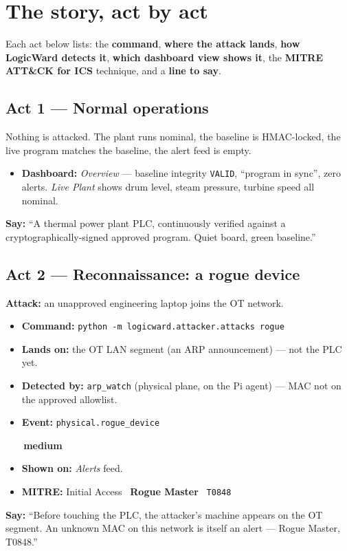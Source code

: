 \documentclass[11pt,a4paper]{article}
\newcommand{\code}[1]{\texttt{\small #1}}
\newcommand{\sev}[2]{\colorbox{#1}{\small\strut\,#2\,}}
\newcommand{\med}{\sev{medbg}{\color{warn}\textbf{medium}}}
\begin{document}
\section{The story, act by act}

Each act below lists: the \textbf{command}, \textbf{where the attack lands}, \textbf{how
LogicWard detects it}, \textbf{which dashboard view shows it}, the \textbf{MITRE ATT\&CK
for ICS} technique, and a \textbf{line to say}.

\subsection{Act 1 --- Normal operations}
Nothing is attacked. The plant runs nominal, the baseline is HMAC-locked, the live program
matches the baseline, the alert feed is empty.
\begin{itemize}[leftmargin=1.3em,itemsep=1pt]
  \item \textbf{Dashboard:} \emph{Overview} --- baseline integrity \code{VALID}, ``program
        in sync'', zero alerts. \emph{Live Plant} shows drum level, steam pressure, turbine
        speed all nominal.
\end{itemize}
\begin{say}\textbf{Say:} ``A thermal power plant PLC, continuously verified against a
cryptographically-signed approved program. Quiet board, green baseline.''\end{say}

\subsection{Act 2 --- Reconnaissance: a rogue device}
\textbf{Attack:} an unapproved engineering laptop joins the OT network.
\begin{itemize}[leftmargin=1.3em,itemsep=1pt]
  \item \textbf{Command:} \code{python -m logicward.attacker.attacks rogue}
  \item \textbf{Lands on:} the OT LAN segment (an ARP announcement) --- not the PLC yet.
  \item \textbf{Detected by:} \code{arp\_watch} (physical plane, on the Pi agent) --- MAC not
        on the approved allowlist.
  \item \textbf{Event:} \code{physical.rogue\_device} \quad\med
  \item \textbf{Shown on:} \emph{Alerts} feed.
  \item \textbf{MITRE:} Initial Access \textbullet\ \textbf{Rogue Master} \textbullet\ \code{T0848}
\end{itemize}
\begin{say}\textbf{Say:} ``Before touching the PLC, the attacker's machine appears on the
OT segment. An unknown MAC on this network is itself an alert --- Rogue Master, T0848.''\end{say}
\end{document}
